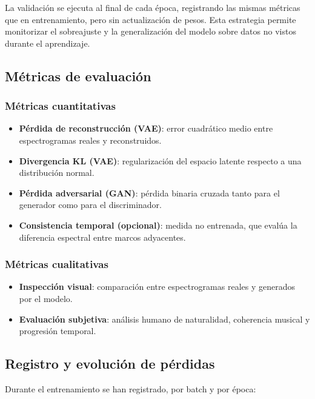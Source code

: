 La validación se ejecuta al final de cada época, registrando las mismas métricas que en entrenamiento, pero sin actualización de pesos. Esta estrategia permite monitorizar el sobreajuste y la generalización del modelo sobre datos no vistos durante el aprendizaje.

\subsection{Métricas de evaluación}

\subsubsection*{Métricas cuantitativas}

\begin{itemize}
    \item \textbf{Pérdida de reconstrucción (VAE)}: error cuadrático medio entre espectrogramas reales y reconstruidos.
    \item \textbf{Divergencia KL (VAE)}: regularización del espacio latente respecto a una distribución normal.
    \item \textbf{Pérdida adversarial (GAN)}: pérdida binaria cruzada tanto para el generador como para el discriminador.
    \item \textbf{Consistencia temporal (opcional)}: medida no entrenada, que evalúa la diferencia espectral entre marcos adyacentes.
\end{itemize}

\subsubsection*{Métricas cualitativas}

\begin{itemize}
    \item \textbf{Inspección visual}: comparación entre espectrogramas reales y generados por el modelo.
    \item \textbf{Evaluación subjetiva}: análisis humano de naturalidad, coherencia musical y progresión temporal.
\end{itemize}

\subsection{Registro y evolución de pérdidas}

Durante el entrenamiento se han registrado, por batch y por época:

